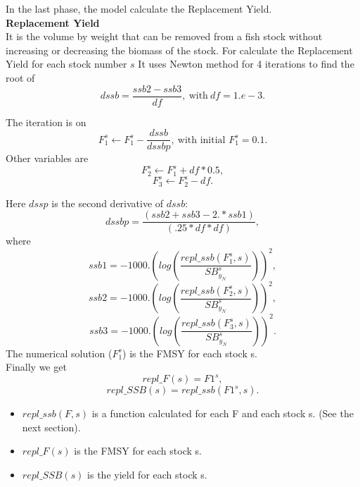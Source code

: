 \documentclass{article}
\begin{document}
In the last phase, the model calculate the Replacement Yield.\\

\textbf{Replacement Yield}\\
It is the volume by weight that can be removed from a fish stock without increasing or decreasing the biomass of the stock.
For calculate the Replacement Yield for each stock  number $s$ It uses Newton method for 4 iterations to find the root of 
\begin{equation}
    dssb   = \dfrac{ssb2 - ssb3}{df}, \ \text{with} \  df=1.e-3.
\end{equation}

The iteration is on
\begin{equation}
    F_{1}^s\leftarrow F_{1}^s-\dfrac{dssb}{dssbp}, \ \text{with initial $F_{1}^s=0.1$}.
\end{equation}
Other variables are
\begin{equation}
    F_2^s \leftarrow F_1^s+df*0.5,
\end{equation}
\begin{equation}
    F_3^s \leftarrow F_2^s -df.
\end{equation}

Here $dssp$ is the second derivative of $dssb$:
\begin{equation}
    dssbp  = \dfrac{(ssb2 + ssb3 - 2.*ssb1)}{(.25*df*df)},
\end{equation}
where
\begin{equation}
    ssb1=-1000.\left(log\left(\dfrac{repl\_ssb(F_1^s,s)}{SB^s_{y_N}}\right)\right)^2,
\end{equation}
\begin{equation}
    ssb2=-1000.\left(log\left(\dfrac{repl\_ssb(F_2^s,s)}{SB^s_{y_N}}\right)\right)^2,
\end{equation}
\begin{equation}
    ssb3=-1000.\left(log\left(\dfrac{repl\_ssb(F_3^s,s)}{SB^s_{y_N}}\right)\right)^2.
\end{equation}
The numerical solution ($F_1^s$) is the  FMSY for each stock s.\\
Finally we get
\begin{equation}
    repl\_F(s) = F1^s,
\end{equation}
\begin{equation}
    repl\_SSB(s) = repl\_ssb(F1^s,s).
\end{equation}
\begin{itemize}
    \item $repl\_ssb(F,s)$ is a function calculated for each F and each stock s. (See the next section).
    \item $repl\_F(s)$ is the FMSY for each stock s.
    \item $repl\_SSB(s)$ is the yield for each stock s.
\end{itemize}
\end{document}
